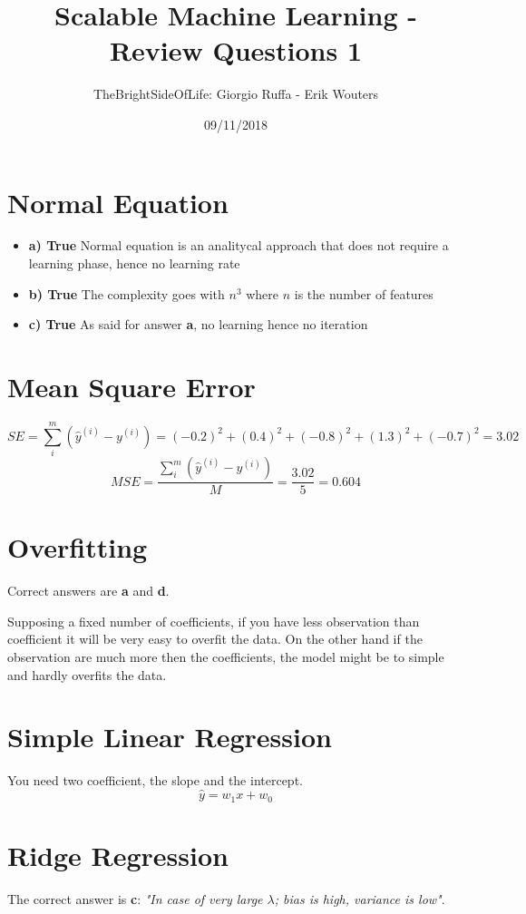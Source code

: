 \documentclass[a4paper]{article}
\title{Scalable Machine Learning - Review Questions 1}
\author{TheBrightSideOfLife: Giorgio Ruffa - Erik Wouters}
\date{09/11/2018}
\begin{document}
\maketitle

\section{Normal Equation}
\begin{itemize}
    \item \textbf{a) True} Normal equation is an analitycal approach that does not require a learning phase, hence no learning rate
    \item \textbf{b) True} The complexity goes with $n^3$ where $n$ is the number of features
    \item \textbf{c) True} As said for answer \textbf{a}, no learning hence no iteration
\end{itemize}

\section{Mean Square Error}
$$SE=\sum_{i}^{m} (\hat{y}^{(i)} - y^{(i)}) = (-0.2)^2 + (0.4)^2 + (-0.8)^2 + (1.3)^2 + (-0.7)^2 = 3.02$$ 
$$MSE=\frac{\sum_{i}^{m} (\hat{y}^{(i)} - y^{(i)})}{M} = \frac{3.02}{5} = 0.604$$

\section{Overfitting}
Correct answers are \textbf{a} and \textbf{d}.

Supposing a fixed number of coefficients, if you have less observation than coefficient it will be very easy to overfit the data. On the other hand if the observation are much more then the coefficients, the model might be to simple and hardly overfits the data.

\section{Simple Linear Regression}
You need two coefficient, the slope and the intercept.
$$\hat{y} = w_1 x + w_0$$

\section{Ridge Regression}
The correct answer is \textbf{c}: \textit{"In case of very large $\lambda$; bias is high, variance is low"}.
\end{document}
